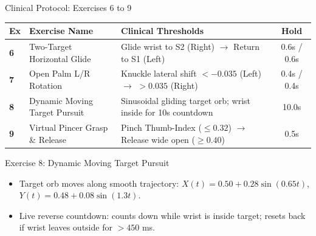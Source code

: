 \documentclass{beamer}
\begin{document}
\begin{frame}{Clinical Protocol: Exercises 6 to 9}
\begin{table}[]
\centering
\small
\begin{tabular}{lp{3.5cm}p{3.5cm}c}
\toprule
\textbf{Ex} & \textbf{Exercise Name} & \textbf{Clinical Thresholds} & \textbf{Hold} \\
\midrule
\textbf{6} & Two-Target Horizontal Glide & Glide wrist to S2 (Right) $\rightarrow$ Return to S1 (Left) & 0.6s / 0.6s \\
\textbf{7} & Open Palm L/R Rotation & Knuckle lateral shift $<-0.035$ (Left) $\rightarrow$ $>0.035$ (Right) & 0.4s / 0.4s \\
\textbf{8} & Dynamic Moving Target Pursuit & Sinusoidal gliding target orb; wrist inside for 10s countdown & 10.0s \\
\textbf{9} & Virtual Pincer Grasp \& Release & Pinch Thumb-Index ($\le 0.32$) $\rightarrow$ Release wide open ($\ge 0.40$) & 0.5s \\
\bottomrule
\end{tabular}
\end{table}

\begin{block}{Exercise 8: Dynamic Moving Target Pursuit}
\begin{itemize}
    \item Target orb moves along smooth trajectory: $X(t) = 0.50 + 0.28\sin(0.65t)$, $Y(t) = 0.48 + 0.08\sin(1.3t)$.
    \item Live reverse countdown: counts down while wrist is inside target; resets back if wrist leaves outside for $>450$ ms.
\end{itemize}
\end{block}
\end{frame}
\end{document}
